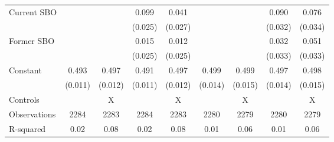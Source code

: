 {\begin{tabular}{l*{8}{c}}
Current SBO         &                     &                     &       0.099\sym{***}&       0.041         &                     &                     &       0.090\sym{**} &       0.076\sym{*}  \\
                    &                     &                     &     (0.025)         &     (0.027)         &                     &                     &     (0.032)         &     (0.034)         \\
Former SBO          &                     &                     &       0.015         &       0.012         &                     &                     &       0.032         &       0.051         \\
                    &                     &                     &     (0.025)         &     (0.025)         &                     &                     &     (0.033)         &     (0.033)         \\
Constant            &       0.493\sym{***}&       0.497\sym{***}&       0.491\sym{***}&       0.497\sym{***}&       0.499\sym{***}&       0.499\sym{***}&       0.497\sym{***}&       0.498\sym{***}\\
                    &     (0.011)         &     (0.012)         &     (0.011)         &     (0.012)         &     (0.014)         &     (0.015)         &     (0.014)         &     (0.015)         \\
\hline
Controls            &                     &           X         &                     &           X         &                     &           X         &                     &           X         \\
Observations        &        2284         &        2283         &        2284         &        2283         &        2280         &        2279         &        2280         &        2279         \\
R-squared           &        0.02         &        0.08         &        0.02         &        0.08         &        0.01         &        0.06         &        0.01         &        0.06         \\
\hline\hline
\end{tabular}
}
